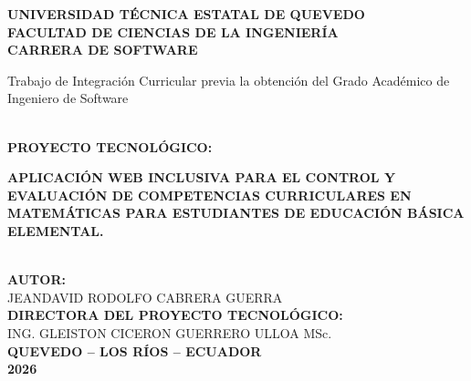 \documentclass[12pt,a4paper,oneside]{report}
\begin{document}
\thispagestyle{empty}

\begin{center}
    \vspace*{0.5cm}
    {\bfseries\large UNIVERSIDAD TÉCNICA ESTATAL DE QUEVEDO}\\[0.4cm]
    {\bfseries\large FACULTAD DE CIENCIAS DE LA INGENIERÍA}\\[0.4cm]
    {\bfseries\large CARRERA DE SOFTWARE}\\[2cm]

    \begin{minipage}{0.75\textwidth}
        \centering
        \onehalfspacing
        Trabajo de Integración Curricular previa la obtención del Grado Académico de Ingeniero de Software
    \end{minipage}\\[1.8cm]

    {\bfseries PROYECTO TECNOLÓGICO:}\\[0.6cm]
    \begin{minipage}{0.85\textwidth}
        \centering
        \bfseries
        APLICACIÓN WEB INCLUSIVA PARA EL CONTROL Y EVALUACIÓN DE COMPETENCIAS CURRICULARES EN MATEMÁTICAS PARA ESTUDIANTES DE EDUCACIÓN BÁSICA ELEMENTAL.
    \end{minipage}\\[1.8cm]

    {\bfseries AUTOR:}\\[0.3cm]
    JEANDAVID RODOLFO CABRERA GUERRA\\[1.2cm]

    {\bfseries DIRECTORA DEL PROYECTO TECNOLÓGICO:}\\[0.3cm]
    ING. GLEISTON CICERON GUERRERO ULLOA MSc.\\[2cm]

    {\bfseries QUEVEDO -- LOS RÍOS -- ECUADOR}\\[0.4cm]
    {\bfseries 2026}
\end{center}

\newpage

\setcounter{page}{2}
\end{document}
